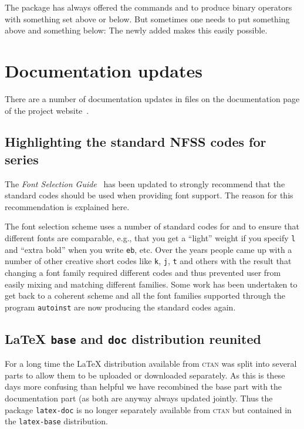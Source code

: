 \documentclass{ltnews}
\providecommand\CTAN{\textsc{ctan}}
\begin{document}
The  package has always offered 
the commands  and
 to produce binary operators with something set above or
below. But sometimes one needs to put something above and something below: 
The newly added  makes this
easily possible.



\section{Documentation updates}

There are a number of
documentation updates in files 
on the documentation page of the project website~\cite{30:site-doc}.

\subsection{Highlighting the standard NFSS codes for series} 

The \emph{Font Selection Guide}~\cite{fntguide} has been
updated to strongly recommend that the standard codes should be used
when providing font support.  The reason for this recommendation is explained here.


The font selection scheme uses a number of standard codes for
 and  to ensure that different fonts are
comparable, e.g., that you get a \enquote{light} weight if you specify
\texttt{l} and \enquote{extra bold} when you write \texttt{eb},
etc. Over the years people came up with a number of other creative
short codes like \texttt{k}, \texttt{j}, \texttt{t} and others with
the result that changing a font family required different codes and
thus prevented user from easily mixing and matching different
families. 
Some work has been undertaken to get back to a coherent scheme and
all the font families supported through the program \texttt{autoinst}
are now producing the standard codes again. 


\subsection{\LaTeX{} \texttt{base} and \texttt{doc} distribution reunited}
      
For a long time the \LaTeX{} distribution available from \CTAN{} was
split into several parts to allow them to be uploaded or downloaded
separately. As this is these days more confusing than helpful we have
recombined the base part with the documentation part (as both are
anyway always updated jointly. Thus the package \texttt{latex-doc}
is no longer separately available from \CTAN{} but contained in the
\texttt{latex-base} distribution.
\end{document}
